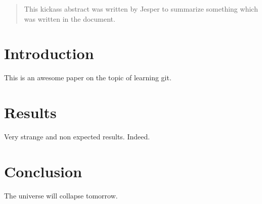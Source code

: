 \documentclass{article}
\begin{document}
\begin{abstract}
This kickass abstract was written by Jesper to summarize something which was written in the document.
\end{abstract}

\section{Introduction}

This is an awesome paper on the topic of learning git.

\section{Results}

Very strange and non expected results.  
Indeed.

\section{Conclusion}

The universe will collapse tomorrow.
\end{document}
